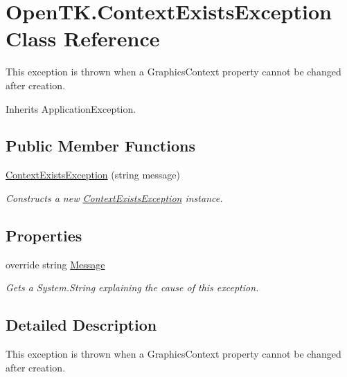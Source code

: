 \hypertarget{class_open_t_k_1_1_context_exists_exception}{\section{Open\-T\-K.\-Context\-Exists\-Exception Class Reference}
\label{class_open_t_k_1_1_context_exists_exception}
}


This exception is thrown when a Graphics\-Context property cannot be changed after creation.  




Inherits Application\-Exception.

\subsection*{Public Member Functions}
\begin{DoxyCompactItemize}
\item 
\hyperlink{class_open_t_k_1_1_context_exists_exception_af20ea50e3acd2e31acd3681160583ed4}{Context\-Exists\-Exception} (string message)
\begin{DoxyCompactList}\small\item\em Constructs a new \hyperlink{class_open_t_k_1_1_context_exists_exception}{Context\-Exists\-Exception} instance. \end{DoxyCompactList}\end{DoxyCompactItemize}
\subsection*{Properties}
\begin{DoxyCompactItemize}
\item 
override string \hyperlink{class_open_t_k_1_1_context_exists_exception_aab5a98f8c4225581129087027960bda6}{Message}
\begin{DoxyCompactList}\small\item\em Gets a System.\-String explaining the cause of this exception. \end{DoxyCompactList}\end{DoxyCompactItemize}


\subsection{Detailed Description}
This exception is thrown when a Graphics\-Context property cannot be changed after creation. 



